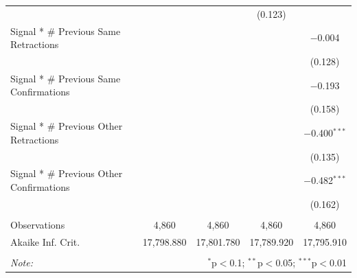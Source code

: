 \begin{table}[!htbp]
\begin{tabular}{@{\extracolsep{5pt}}lcccc}
  &  &  & (0.123) &  \\ 
  Signal * # Previous Same Retractions &  &  &  & $-$0.004 \\ 
  &  &  &  & (0.128) \\ 
  Signal * # Previous Same Confirmations &  &  &  & $-$0.193 \\ 
  &  &  &  & (0.158) \\ 
  Signal * # Previous Other Retractions &  &  &  & $-$0.400$^{***}$ \\ 
  &  &  &  & (0.135) \\ 
  Signal * # Previous Other Confirmations &  &  &  & $-$0.482$^{***}$ \\ 
  &  &  &  & (0.162) \\ 
 \hline \\[-1.8ex] 
Observations & 4,860 & 4,860 & 4,860 & 4,860 \\ 
Akaike Inf. Crit. & 17,798.880 & 17,801.780 & 17,789.920 & 17,795.910 \\ 
\hline 
\hline \\[-1.8ex] 
\textit{Note:}  & \multicolumn{4}{r}{$^{*}$p$<$0.1; $^{**}$p$<$0.05; $^{***}$p$<$0.01} \\ 
\end{tabular} 
\end{table} 
